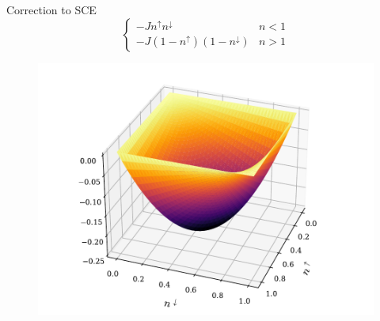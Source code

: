 \documentclass[xcolor=table,aspectratio=169]{beamer}
\numberwithin{equation}{section}
\begin{document}
\begin{frame}{Correction to SCE}
    \vspace{-1em}
    \begin{equation*}
        \begin{cases}
            - Jn^\uparrow n^\downarrow            & n < 1 \\
            - J(1 - n^\uparrow)(1 - n^\downarrow) & n > 1
        \end{cases}
        \label{eqn:novel_k_correction}
    \end{equation*}
    \vspace{-1em}
    \begin{figure}[t!]
        \includegraphics[width=0.5\columnwidth]{figures/novel_k_correction.pdf}
        \label{fig:novel_k_correction}
    \end{figure}
\end{frame}
\end{document}
